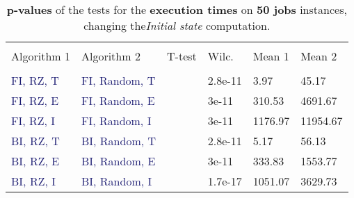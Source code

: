 \documentclass[
12pt,
a4paper,
oneside,
headinclude,
footinclude]{article}
\theoremstyle{definition} %
\begin{document}
\begin{table}[H]
    \begin{tabular}{l l l l l l} %
        \hline
        \hline 
        \\[-1.5ex]
        \textcolor{BrickRed}{Algorithm 1} & \textcolor{BrickRed}{Algorithm 2} & \textcolor{BrickRed}{T-test} & \textcolor{BrickRed}{Wilc.}  & \textcolor{BrickRed}{Mean 1} & \textcolor{BrickRed}{Mean 2}\\ [0.5ex]
        \hline %
        \\[-1.5ex]
         \textcolor{MidnightBlue}{FI, RZ, T}&  \textcolor{MidnightBlue}{FI, Random, T} &  & 2.8e-11 & 3.97 & 45.17 \\ 
         \textcolor{MidnightBlue}{FI, RZ, E}&  \textcolor{MidnightBlue}{FI, Random, E} &  & 3e-11 & 310.53 & 4691.67 \\ 
         \textcolor{MidnightBlue}{FI, RZ, I}&  \textcolor{MidnightBlue}{FI, Random, I} &  & 3e-11 & 1176.97 & 11954.67 \\ 
         \textcolor{MidnightBlue}{BI, RZ, T}&  \textcolor{MidnightBlue}{BI, Random, T} &  & 2.8e-11 &  5.17 & 56.13 \\ 
         \textcolor{MidnightBlue}{BI, RZ, E}&  \textcolor{MidnightBlue}{BI, Random, E} &  & 3e-11 & 333.83 & 1553.77 \\ 
         \textcolor{MidnightBlue}{BI, RZ, I}&  \textcolor{MidnightBlue}{BI, Random, I} &  & 1.7e-17 & 1051.07 & 3629.73 \\ 
        [1ex] %
        \hline %
    \end{tabular}
    \caption{\label{tab:ii-initialstate50exec}\textbf{p-values} of the tests for the \textbf{execution times} on \textbf{50 jobs} instances, changing the\textit{Initial state} computation.}
\end{table} 
\end{document}
